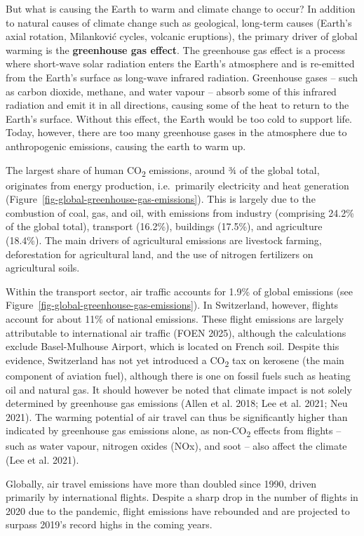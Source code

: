 \documentclass[
  a4paper,
  DIV=11,
  numbers=noendperiod,
  oneside,
  openany]{scrreprt}
\begin{document}
But what is causing the Earth to warm and climate change to occur? In
addition to natural causes of climate change such as geological,
long-term causes (Earth's axial rotation, Milanković cycles, volcanic
eruptions), the primary driver of global warming is the
\textbf{greenhouse gas effect}. The greenhouse gas effect is a process
where short-wave solar radiation enters the Earth's atmosphere and is
re-emitted from the Earth's surface as long-wave infrared radiation.
Greenhouse gases -- such as carbon dioxide, methane, and water vapour --
absorb some of this infrared radiation and emit it in all directions,
causing some of the heat to return to the Earth's surface. Without this
effect, the Earth would be too cold to support life. Today, however,
there are too many greenhouse gases in the atmosphere due to
anthropogenic emissions, causing the earth to warm up.

The largest share of human CO\textsubscript{2} emissions, around ¾ of
the global total, originates from energy production, i.e.~primarily
electricity and heat generation
(Figure~\ref{fig-global-greenhouse-gas-emissions}). This is largely due
to the combustion of coal, gas, and oil, with emissions from industry
(comprising 24.2\% of the global total), transport (16.2\%), buildings
(17.5\%), and agriculture (18.4\%). The main drivers of agricultural
emissions are livestock farming, deforestation for agricultural land,
and the use of nitrogen fertilizers on agricultural soils.

Within the transport sector, air traffic accounts for 1.9\% of global
emissions (see Figure~\ref{fig-global-greenhouse-gas-emissions}). In
Switzerland, however, flights account for about 11\% of national
emissions. These flight emissions are largely attributable to
international air traffic (FOEN 2025), although the calculations exclude
Basel-Mulhouse Airport, which is located on French soil. Despite this
evidence, Switzerland has not yet introduced a CO\textsubscript{2} tax
on kerosene (the main component of aviation fuel), although there is one
on fossil fuels such as heating oil and natural gas. It should however
be noted that climate impact is not solely determined by greenhouse gas
emissions (Allen et al. 2018; Lee et al. 2021; Neu 2021). The warming
potential of air travel can thus be significantly higher than indicated
by greenhouse gas emissions alone, as non-CO\textsubscript{2} effects
from flights -- such as water vapour, nitrogen oxides (NOx), and soot --
also affect the climate (Lee et al. 2021).

Globally, air travel emissions have more than doubled since 1990, driven
primarily by international flights. Despite a sharp drop in the number
of flights in 2020 due to the pandemic, flight emissions have rebounded
and are projected to surpass 2019's record highs in the coming years.
\end{document}
